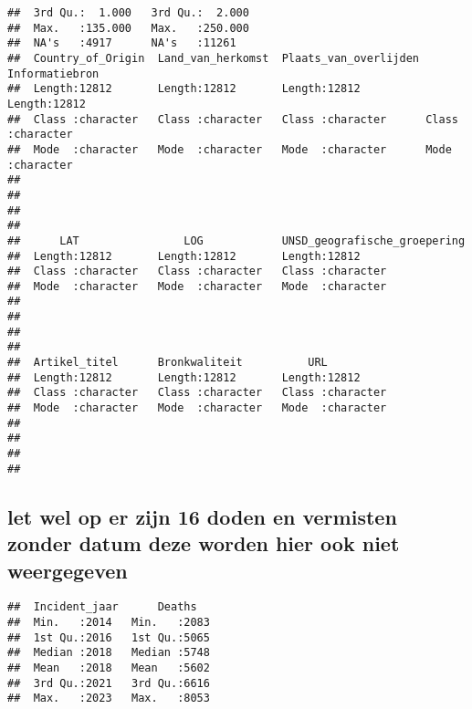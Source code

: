 \documentclass[
]{article}
\begin{document}
\begin{verbatim}
##  3rd Qu.:  1.000   3rd Qu.:  2.000                                         
##  Max.   :135.000   Max.   :250.000                                         
##  NA's   :4917      NA's   :11261                                           
##  Country_of_Origin  Land_van_herkomst  Plaats_van_overlijden Informatiebron    
##  Length:12812       Length:12812       Length:12812          Length:12812      
##  Class :character   Class :character   Class :character      Class :character  
##  Mode  :character   Mode  :character   Mode  :character      Mode  :character  
##                                                                                
##                                                                                
##                                                                                
##                                                                                
##      LAT                LOG            UNSD_geografische_groepering
##  Length:12812       Length:12812       Length:12812                
##  Class :character   Class :character   Class :character            
##  Mode  :character   Mode  :character   Mode  :character            
##                                                                    
##                                                                    
##                                                                    
##                                                                    
##  Artikel_titel      Bronkwaliteit          URL           
##  Length:12812       Length:12812       Length:12812      
##  Class :character   Class :character   Class :character  
##  Mode  :character   Mode  :character   Mode  :character  
##                                                          
##                                                          
##                                                          
## 
\end{verbatim}

\hypertarget{let-wel-op-er-zijn-16-doden-en-vermisten-zonder-datum-deze-worden-hier-ook-niet-weergegeven}{%
\subsection{let wel op er zijn 16 doden en vermisten zonder datum deze
worden hier ook niet
weergegeven}\label{let-wel-op-er-zijn-16-doden-en-vermisten-zonder-datum-deze-worden-hier-ook-niet-weergegeven}}

\begin{verbatim}
##  Incident_jaar      Deaths    
##  Min.   :2014   Min.   :2083  
##  1st Qu.:2016   1st Qu.:5065  
##  Median :2018   Median :5748  
##  Mean   :2018   Mean   :5602  
##  3rd Qu.:2021   3rd Qu.:6616  
##  Max.   :2023   Max.   :8053
\end{verbatim}
\end{document}
